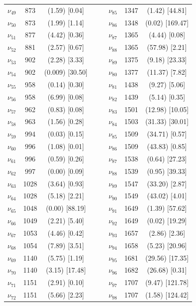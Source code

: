 \begin{table}[H]
\begin{center}
\begin{threeparttable}
\begin{tabular}{c c c c c c c c}
	$\nu_{49}$&	873	&(1.59)	[0.04]& & & 	$\nu_{85}$&	1347&	(1.42)	[44.81]\\
	$\nu_{50}$&	873	&(1.99)	[1.14]& & & 	$\nu_{86}$&	1348&	(0.02)	[169.47]\\
	$\nu_{51}$&	877	&(4.42)	[0.36]& &  &	$\nu_{87}$&	1365&	(4.44)	[0.08]\\
	$\nu_{52}$&	881	&(2.57)	[0.67]& & & 	$\nu_{88}$&	1365&	(57.98)	[2.21]\\
	$\nu_{53}$&	902	&(2.28)	[3.33]& & & 	$\nu_{89}$&	1375&	(9.18)	[23.33]\\
	$\nu_{54}$&	902	&(0.009)	[30.50]& & & 	$\nu_{80}$&	1377&	(11.37)	[7.82]\\
	$\nu_{55}$&	958	&(0.14)	[0.30]	& & & $\nu_{81}$&	1438&	(9.27)	[5.06]\\
	$\nu_{56}$&	958	&(6.99)	[0.08]& & & 	$\nu_{82}$&	1439&	(5.14)	[0.35]\\
	$\nu_{57}$&	962	&(0.83)	[0.08]& & & 	$\nu_{83}$&	1501&	(12.98)	[10.05]\\
	$\nu_{58}$&	963	&(1.56)	[0.28]& &  &	$\nu_{84}$&	1503&	(31.33)	[30.01]\\
	$\nu_{59}$&	994	&(0.03)	[0.15]& &  &	$\nu_{85}$&	1509&	(34.71)	[0.57]\\
	$\nu_{60}$&	996	&(1.08)	[0.01]& &  &	$\nu_{86}$&	1509&	(43.83)	[0.85]\\
	$\nu_{61}$&	996	&(0.59)	[0.26]& & & 	$\nu_{87}$&	1538&	(0.64)	[27.23]\\
	$\nu_{62}$&	997	&(0.00)	[0.09]& & & 	$\nu_{88}$&	1539&	(0.95)	[39.33]\\
	$\nu_{63}$&	1028&	(3.64)	[0.93]& & & 	$\nu_{89}$&	1547&	(33.20)	[2.87]\\
	$\nu_{64}$&	1028&	(5.18)	[2.21]& & & 	$\nu_{90}$&	1549&	(43.02)	[4.01]\\
	$\nu_{65}$&	1048&	(0.00)	[88.19]& &  &	$\nu_{91}$&	1649	&(1.39)	[57.62]\\
	$\nu_{66}$&	1049&	(2.21)	[5.40]	& &  &$\nu_{92}$&	1649&	(0.02)	[19.29]\\
	$\nu_{67}$&	1053&	(4.46)	[0.42]& & & 	$\nu_{93}$&	1657&	(2.86)	[2.36]\\
	$\nu_{68}$&	1054&	(7.89)	[3.51]& & & 	$\nu_{94}$&	1658&	(5.23)	[20.96]\\
	$\nu_{69}$&	1140&	(5.75)	[1.19]& & & 	$\nu_{95}$&	1681&	(29.56)	[17.35]\\
	$\nu_{70}$&	1140&	(3.15)	[17.48]& & & 	$\nu_{96}$&	1682&	(26.68)	[0.31]\\
	$\nu_{71}$&	1151&	(2.91)	[0.10]	& & & $\nu_{97}$&	1707&	(9.47)	[121.78]\\
	$\nu_{72}$&	1151&	(5.66)	[2.23]& & & 	$\nu_{98}$&	1707&	(1.58)	[124.42]\\
				\bottomrule
				\end{tabular}
				

\end{threeparttable}
\end{center}
\end{table}
